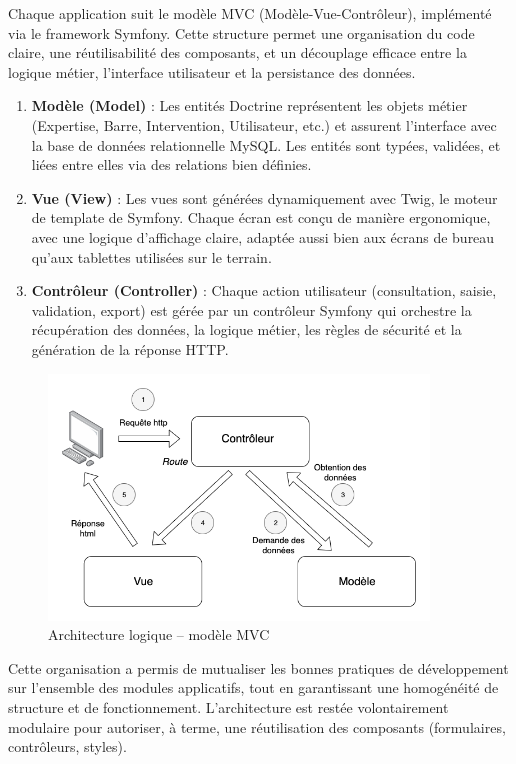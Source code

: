 \documentclass[11pt,a4paper]{article}
\begin{document}
Chaque application suit le modèle MVC (Modèle-Vue-Contrôleur), implémenté via le framework Symfony. Cette structure permet une organisation du code claire, une réutilisabilité des composants, et un découplage efficace entre la logique métier, l’interface utilisateur et la persistance des données.
\begin{enumerate}
\item \textbf{Modèle (Model)} : Les entités Doctrine représentent les objets métier (Expertise, Barre, Intervention, Utilisateur, etc.) et assurent l’interface avec la base de données relationnelle MySQL. Les entités sont typées, validées, et liées entre elles via des relations bien définies.
\item \textbf{Vue (View)} : Les vues sont générées dynamiquement avec Twig, le moteur de template de Symfony. Chaque écran est conçu de manière ergonomique, avec une logique d’affichage claire, adaptée aussi bien aux écrans de bureau qu’aux tablettes utilisées sur le terrain.
\item \textbf{Contrôleur (Controller)} : Chaque action utilisateur (consultation, saisie, validation, export) est gérée par un contrôleur Symfony qui orchestre la récupération des données, la logique métier, les règles de sécurité et la génération de la réponse HTTP.

\end{enumerate}

\begin{figure}[H]
    \centering
    \includegraphics[width=0.9\textwidth]{../Images/architecture-logique.png}
    \caption{Architecture logique – modèle MVC}
    \label{fig:architecture_logiciel}
\end{figure}

Cette organisation a permis de mutualiser les bonnes pratiques de développement sur l’ensemble des modules applicatifs, tout en garantissant une homogénéité de structure et de fonctionnement. L’architecture est restée volontairement modulaire pour autoriser, à terme, une réutilisation des composants (formulaires, contrôleurs, styles).
\end{document}
